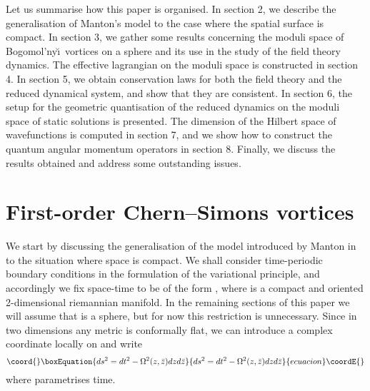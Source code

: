 \documentclass[a4paper,11pt]{article}
\begin{document}
Let us summarise how this paper is organised.
In section 2, we describe the generalisation of Manton's model
to the case where the spatial surface is compact. 
In section 3, we gather some results concerning the moduli space of
Bogomol'ny\u \i\ vortices on a sphere and its use in the study of
the field theory dynamics. 
The effective lagrangian on the moduli space is constructed in section 4.
In section 5, we obtain conservation laws for both the field 
theory and the reduced dynamical system, and show that they are
consistent.
In section 6, the setup for the geometric quantisation
of the reduced dynamics on the moduli space of static 
solutions is presented. 
The dimension of the Hilbert space of wavefunctions is computed in 
section 7, and we show how to construct the quantum angular momentum 
operators in section 8.
Finally, we discuss the results obtained and address some outstanding
issues.


\section{First-order Chern--Simons vortices}


We start by discussing the generalisation of the model introduced by
Manton in \cite{Mfovd} to the situation where space is compact. We
shall consider time-periodic boundary conditions in the formulation of
the variational principle, and accordingly we fix space-time to be of 
the form \coordHE{}, where \myHighlight{$\Sigma$}\coordHE{} is a compact and oriented
2-dimensional riemannian manifold. 
In the remaining sections of this paper we will assume that \myHighlight{$\Sigma$}\coordHE{} 
is a sphere, but for now this restriction is unnecessary.
Since in two dimensions any metric is conformally
flat, we can introduce a complex coordinate \coordHE{} locally on \myHighlight{$\Sigma$}\coordHE{}
and write
\begin{equation}\coord{}\boxEquation{\label{metric}
ds^{2} = dt^{2}-\Omega^{2}(z,\bar{z})dzd\bar{z}
}{ds^{2} = dt^{2}-\Omega^{2}(z,\bar{z})dzd\bar{z}
}{ecuacion}\coordE{}\end{equation}
where \coordHE{} parametrises time.
\end{document}
